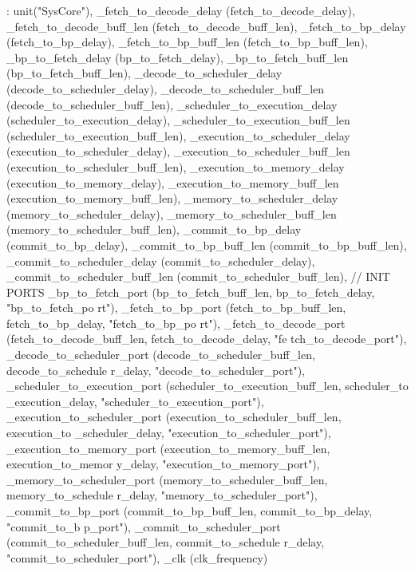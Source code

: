 \begin{DoxyCode}
        : unit("SysCore"),
      _fetch_to_decode_delay (fetch_to_decode_delay),
          _fetch_to_decode_buff_len (fetch_to_decode_buff_len),
          _fetch_to_bp_delay (fetch_to_bp_delay),
          _fetch_to_bp_buff_len (fetch_to_bp_buff_len),
          _bp_to_fetch_delay (bp_to_fetch_delay),
          _bp_to_fetch_buff_len (bp_to_fetch_buff_len),
          _decode_to_scheduler_delay (decode_to_scheduler_delay),
          _decode_to_scheduler_buff_len (decode_to_scheduler_buff_len),
          _scheduler_to_execution_delay (scheduler_to_execution_delay),
          _scheduler_to_execution_buff_len (scheduler_to_execution_buff_len),
          _execution_to_scheduler_delay (execution_to_scheduler_delay),
          _execution_to_scheduler_buff_len (execution_to_scheduler_buff_len),
          _execution_to_memory_delay (execution_to_memory_delay),
          _execution_to_memory_buff_len (execution_to_memory_buff_len),
          _memory_to_scheduler_delay (memory_to_scheduler_delay),
          _memory_to_scheduler_buff_len (memory_to_scheduler_buff_len),
          _commit_to_bp_delay (commit_to_bp_delay),
          _commit_to_bp_buff_len (commit_to_bp_buff_len),
          _commit_to_scheduler_delay (commit_to_scheduler_delay),
          _commit_to_scheduler_buff_len (commit_to_scheduler_buff_len),
      // INIT PORTS
      _bp_to_fetch_port (bp_to_fetch_buff_len, bp_to_fetch_delay, "bp_to_fetch_po
      rt"),
      _fetch_to_bp_port (fetch_to_bp_buff_len, fetch_to_bp_delay, "fetch_to_bp_po
      rt"),
      _fetch_to_decode_port (fetch_to_decode_buff_len, fetch_to_decode_delay, "fe
      tch_to_decode_port"),
      _decode_to_scheduler_port (decode_to_scheduler_buff_len, decode_to_schedule
      r_delay, "decode_to_scheduler_port"),
      _scheduler_to_execution_port (scheduler_to_execution_buff_len, scheduler_to
      _execution_delay, "scheduler_to_execution_port"),
      _execution_to_scheduler_port (execution_to_scheduler_buff_len, execution_to
      _scheduler_delay, "execution_to_scheduler_port"),
      _execution_to_memory_port (execution_to_memory_buff_len, execution_to_memor
      y_delay, "execution_to_memory_port"),
      _memory_to_scheduler_port (memory_to_scheduler_buff_len, memory_to_schedule
      r_delay, "memory_to_scheduler_port"),
      _commit_to_bp_port (commit_to_bp_buff_len, commit_to_bp_delay, "commit_to_b
      p_port"),
      _commit_to_scheduler_port (commit_to_scheduler_buff_len, commit_to_schedule
      r_delay, "commit_to_scheduler_port"),
          _clk (clk_frequency)

\end{DoxyCode}
